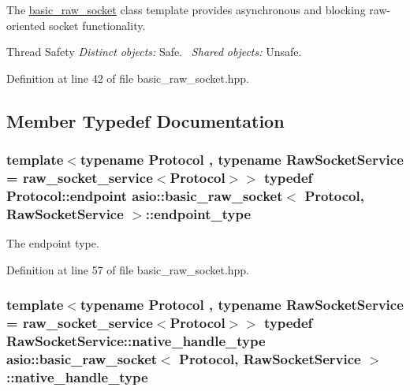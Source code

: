 The \hyperlink{classasio_1_1basic__raw__socket}{basic\+\_\+raw\+\_\+socket} class template provides asynchronous and blocking raw-\/oriented socket functionality.

\begin{DoxyParagraph}{Thread Safety}
{\itshape Distinct} {\itshape objects\+:} Safe.~\newline
{\itshape Shared} {\itshape objects\+:} Unsafe. 
\end{DoxyParagraph}


Definition at line 42 of file basic\+\_\+raw\+\_\+socket.\+hpp.



\subsection{Member Typedef Documentation}
\hypertarget{classasio_1_1basic__raw__socket_a75803815223ab2cbfa66c51a650236b5}{}
\subsubsection[{endpoint\+\_\+type}]{\setlength{\rightskip}{0pt plus 5cm}template$<$typename Protocol , typename Raw\+Socket\+Service  = raw\+\_\+socket\+\_\+service$<$\+Protocol$>$$>$ typedef Protocol\+::endpoint {\bf asio\+::basic\+\_\+raw\+\_\+socket}$<$ Protocol, Raw\+Socket\+Service $>$\+::{\bf endpoint\+\_\+type}}\label{classasio_1_1basic__raw__socket_a75803815223ab2cbfa66c51a650236b5}


The endpoint type. 



Definition at line 57 of file basic\+\_\+raw\+\_\+socket.\+hpp.

\hypertarget{classasio_1_1basic__raw__socket_aa95021a3bc7d9d5a4648d4d82f57b8ae}{}
\subsubsection[{native\+\_\+handle\+\_\+type}]{\setlength{\rightskip}{0pt plus 5cm}template$<$typename Protocol , typename Raw\+Socket\+Service  = raw\+\_\+socket\+\_\+service$<$\+Protocol$>$$>$ typedef Raw\+Socket\+Service\+::native\+\_\+handle\+\_\+type {\bf asio\+::basic\+\_\+raw\+\_\+socket}$<$ Protocol, Raw\+Socket\+Service $>$\+::{\bf native\+\_\+handle\+\_\+type}}\label{classasio_1_1basic__raw__socket_aa95021a3bc7d9d5a4648d4d82f57b8ae}


